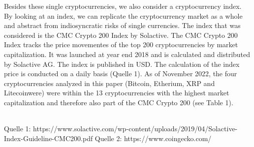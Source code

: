 Besides these single cryptocurrencies, we also consider a cryptocurrency index. By looking at an index, we can replicate the cryptocurrency market as a whole and abstract from indiosyncratic risks of single currencies. The index that was considered is the CMC Crypto 200 Index by Solactive. The CMC Crypto 200 Index tracks the price movementes of the top 200 cryptocurrencies by market capitalization. It was launched at year end 2018 and is calculated and distributed by Solactive AG. The index is published in USD. The calculation of the index price is conducted on a daily basis (Quelle 1). As of November 2022, the four cryptocurrencies analyzed in this paper (Bitcoin, Etherium,  XRP and Litecoinwere) were within the 13 cryptocurrencies with the highest market capitalization and therefore also part of the CMC Crypto 200 (see Table 1).





\\

Quelle 1: https://www.solactive.com/wp-content/uploads/2019/04/Solactive-Index-Guideline-CMC200.pdf
Quelle 2: https://www.coingecko.com/

